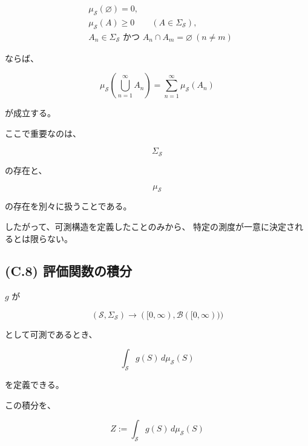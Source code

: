 \documentclass[a4paper,11pt]{article}
\newcommand{\Solver}{\mathcal{S}}
\begin{document}
\begin{align}
    &\mu_{\Solver}(\varnothing)=0,\\
    &\mu_{\Solver}(A)\geq0
        \qquad
        (A\in\Sigma_{\Solver}),\\
    &A_n\in\Sigma_{\Solver}
        \text{ かつ }
        A_n\cap A_m=\varnothing
        \ (n\neq m)
\end{align}

ならば、

\begin{equation}
    \mu_{\Solver}
    \left(
        \bigcup_{n=1}^{\infty}A_n
    \right)
    =
    \sum_{n=1}^{\infty}
    \mu_{\Solver}(A_n)
\end{equation}

が成立する。

ここで重要なのは、

\begin{equation}
    \Sigma_{\Solver}
\end{equation}

の存在と、

\begin{equation}
    \mu_{\Solver}
\end{equation}

の存在を別々に扱うことである。

したがって、可測構造を定義したことのみから、
特定の測度が一意に決定されるとは限らない。


\subsection{(C.8) 評価関数の積分}
\label{subsec:C8}

$g$ が

\begin{equation}
    (\Solver,\Sigma_{\Solver})
    \longrightarrow
    ([0,\infty),\mathcal{B}([0,\infty)))
\end{equation}

として可測であるとき、

\begin{equation}
    \int_{\Solver}
    g(S)\,d\mu_{\Solver}(S)
\end{equation}

を定義できる。

この積分を、

\begin{equation}
    \boxed{
        Z
        :=
        \int_{\Solver}
        g(S)\,d\mu_{\Solver}(S)
    }
    \label{eq:C-normalization-constant}
\end{equation}
\end{document}

